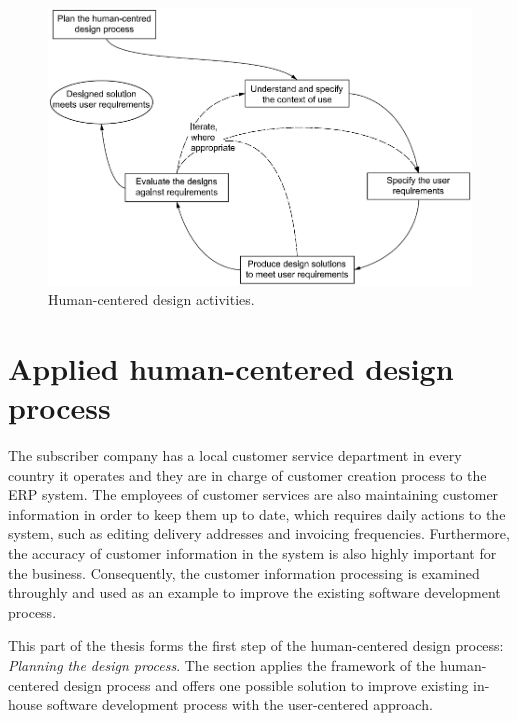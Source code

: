 \documentclass[12pt,a4paper,oneside,pdftex]{report}
\begin{document}
\begin{figure}[H]
  	\centering
    	\includegraphics[width=1.0\textwidth]{./images/hci_process.png}
  	\caption{Human-centered design activities.\cite{RefWorks:16}}
	\label{fig:hci_process}
\end{figure}

\section{Applied human-centered design process}
\label{sec:dprocess}

The subscriber company has a local customer service department in every country it operates and they are in charge of customer creation process to the ERP system. The employees of customer services are also maintaining customer information in order to keep them up to date, which requires daily actions to the system, such as editing delivery addresses and invoicing frequencies. Furthermore, the accuracy of customer information in the system is also highly important for the business. Consequently, the customer information processing is examined throughly and used as an example to improve the existing software development process.

This part of the thesis forms the first step of the human-centered design process: \emph{Planning the design process}. The section applies the framework of the human-centered design process and offers one possible solution to improve existing in-house software development process with the user-centered approach.
\end{document}
